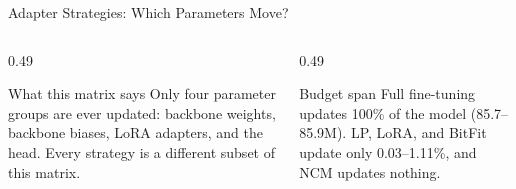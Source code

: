 \documentclass[10pt, aspectratio=169]{beamer}
\begin{document}
\begin{frame}[t]{Adapter Strategies: Which Parameters Move?}
  \vspace{0.55cm}
  \begin{columns}[T]
    \begin{column}{0.49\textwidth}
      \begin{block}{What this matrix says}
        \footnotesize
        Only four parameter groups are ever updated: backbone weights, backbone biases, LoRA adapters, and the head. Every strategy is a different subset of this matrix.
      \end{block}
    \end{column}
    \begin{column}{0.49\textwidth}
      \begin{block}{Budget span}
        \footnotesize
        Full fine-tuning updates 100\% of the model (85.7--85.9M). LP, LoRA, and BitFit update only 0.03--1.11\%, and NCM updates nothing.
      \end{block}
    \end{column}
  \end{columns}
\end{frame}
\end{document}
